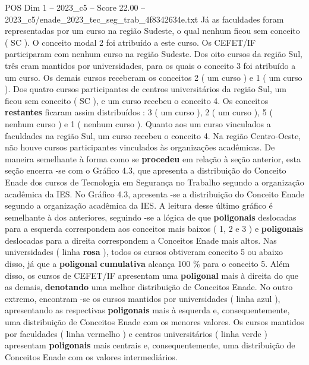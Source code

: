 \begin{textsample}{POS Dim 1 – 2023\_c5 – Score 22.00 – 2023\_c5/enade\_2023\_tec\_seg\_trab\_4f8342634e.txt}
Já as faculdades foram representadas por um curso na região Sudeste, o qual nenhum ficou sem conceito ( SC ).
O conceito modal 2 foi atribuído a este curso.
Os CEFET/IF participaram com nenhum curso na região Sudeste.
Dos oito cursos da região Sul, três eram mantidos por universidades, para os quais o conceito 3 foi atribuído a um curso.
Os demais cursos receberam os conceitos 2 ( um curso ) e 1 ( um curso ).
Dos quatro cursos participantes de centros universitários da região Sul, um ficou sem conceito ( SC ), e um curso recebeu o conceito 4.
Os conceitos \textbf{restantes} ficaram assim distribuídos : 3 ( um curso ), 2 ( um curso ), 5 ( nenhum curso ) e 1 ( nenhum curso ).
Quanto aos um curso vinculados a faculdades na região Sul, um curso recebeu o conceito 4.
Na região Centro-Oeste, não houve cursos participantes vinculados às organizações acadêmicas.
De maneira semelhante à forma como se \textbf{procedeu} em relação à seção anterior, esta seção encerra -se com o Gráfico 4.3, que apresenta a distribuição do Conceito Enade dos cursos de Tecnologia em Segurança no Trabalho segundo a organização acadêmica da IES.
No Gráfico 4.3, apresenta -se a distribuição do Conceito Enade segundo a organização acadêmica da IES.
A leitura desse último gráfico é semelhante à dos anteriores, seguindo -se a lógica de que \textbf{poligonais} deslocadas para a esquerda correspondem aos conceitos mais baixos ( 1, 2 e 3 ) e \textbf{poligonais} deslocadas para a direita correspondem a Conceitos Enade mais altos.
Nas universidades ( linha \textbf{rosa} ), todos os cursos obtiveram conceito 5 ou abaixo disso, já que a \textbf{poligonal} \textbf{cumulativa} alcança 100 \% para o conceito 5.
Além disso, os cursos de CEFET/IF apresentam uma \textbf{poligonal} mais à direita do que as demais, \textbf{denotando} uma melhor distribuição de Conceitos Enade.
No outro extremo, encontram -se os cursos mantidos por universidades ( linha azul ), apresentando as respectivas \textbf{poligonais} mais à esquerda e, consequentemente, uma distribuição de Conceitos Enade com os menores valores.
Os cursos mantidos por faculdades ( linha vermelho ) e centros universitários ( linha verde ) apresentam \textbf{poligonais} mais centrais e, consequentemente, uma distribuição de Conceitos Enade com os valores intermediários.

\end{textsample}
